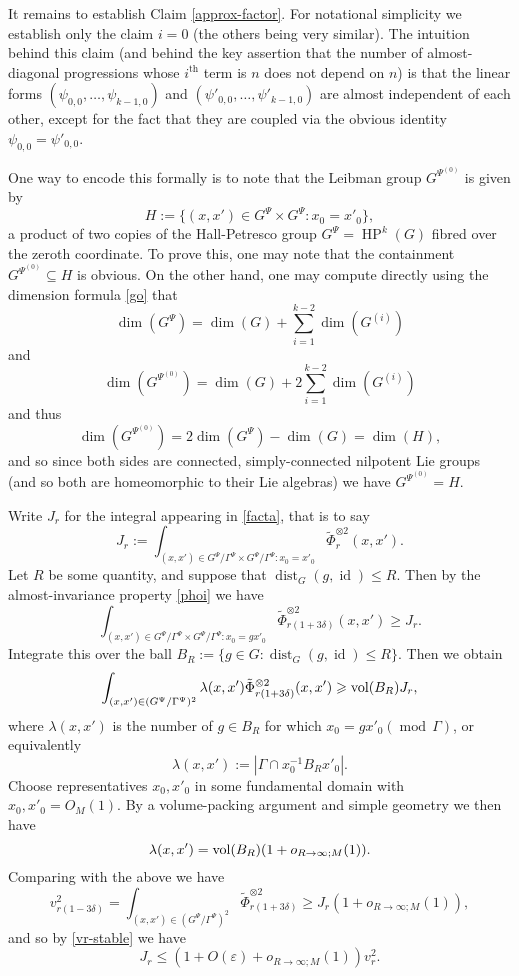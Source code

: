\documentclass[11pt,reqno]{amsart}
\numberwithin{equation}{section}
\theoremstyle{plain}
\theoremstyle{definition}
\renewcommand{\leq}{\leqslant}
\renewcommand{\geq}{\geqslant}
\newcommand{\md}[1]{\ensuremath{(\operatorname{mod}\, #1)}}
\newcommand\1{{\bf 1}}
\newcommand\2{{\bf 2}}
\newcommand\eps{\varepsilon}
\newcommand\HP{\operatorname{HP}}
\newcommand\id{\operatorname{id}}
\newcommand\dist{{\operatorname{dist}}}
\begin{document}
It remains to establish Claim \ref{approx-factor}. For notational simplicity we establish only the claim $i = 0$ (the others being very similar). The intuition behind this claim (and behind the key assertion that the number of almost-diagonal progressions whose $i^{\operatorname{th}}$ term is $n$ does not depend on $n$) is that the linear forms $(\psi_{0,0},\ldots,\psi_{k-1,0})$ and $(\psi'_{0,0},\ldots,\psi'_{k-1,0})$ are almost independent of each other, except for the fact that they are coupled via the obvious identity $\psi_{0,0} = \psi'_{0,0}$. 

One way to encode this formally is to note that the Leibman group $G^{\Psi^{(0)}}$ is given by
\[ H := \{ (x,x') \in G^{\Psi} \times G^{\Psi} : x_0 = x'_0\},\] a product of two copies of the Hall-Petresco group $G^{\Psi} = \HP^k(G)$ fibred over the zeroth coordinate. To prove this, one may note that the containment $G^{\Psi^{(0)}} \subseteq H$ is obvious. On the other hand, one may compute directly using the dimension formula \eqref{go} that
\[ \dim (G^{\Psi}) = \dim(G) + \sum_{i=1}^{k-2} \dim(G^{(i)}) \]
and
\[ \dim (G^{\Psi^{(0)}}) = \dim(G) + 2 \sum_{i=1}^{k-2} \dim(G^{(i)}) \]
and thus
\[ \dim(G^{\Psi^{(0)}}) = 2 \dim (G^{\Psi}) - \dim (G) = \dim (H),\] 
and so since both sides are connected, simply-connected nilpotent Lie groups (and so both are homeomorphic to their Lie algebras) we have $G^{\Psi^{(0)}} = H$.

Write $J_r$ for the integral appearing in \eqref{facta}, that is to say
\[ J_r := \int_{(x, x') \in G^{\Psi}/\Gamma^{\Psi} \times G^{\Psi}/\Gamma^{\Psi} : x_0 = x'_0} \tilde \Phi_r^{\otimes 2}(x,x').\]
Let $R$ be some quantity, and suppose that $\dist_G(g, \id) \leq R$. Then by the almost-invariance property \eqref{phoi} we have
\[ \int_{(x,x') \in G^{\Psi}/\Gamma^{\Psi} \times G^{\Psi}/\Gamma^{\Psi} : x_0 = gx'_0} \tilde \Phi_{r(1 + 3\delta)}^{\otimes 2}(x,x') \geq J_{r}.\]
Integrate this over the ball $B_R := \{g \in G: \dist_G(g,\id) \leq R\}$. Then we obtain
\[ \int_{(x,x') \in (G^{\Psi}/\Gamma^{\Psi} )^2} \lambda(x,x') \tilde \Phi_{r(1 + 3\delta)}^{\otimes 2}(x,x') \geq \vol(B_R) J_{r},\]
where $\lambda(x,x')$ is the number of $g \in B_R$ for which $x_0 = g x'_0 \md{\Gamma}$, or equivalently
\[ \lambda(x,x') := | \Gamma \cap x_0^{-1} B_R x'_0|.\] Choose representatives $x_0, x'_0$ in some fundamental domain with $x_0, x'_0 = O_M(1)$. 
By a volume-packing argument and simple geometry we then have
\[ \lambda(x,x') = \operatorname{vol}(B_R)(1 + o_{R \rightarrow \infty;M}(1)).\]
Comparing with the above we have
\[ v_{r(1 - 3\delta)}^2 = \int_{(x,x') \in (G^{\Psi}/\Gamma^{\Psi} )^2}  \tilde \Phi_{r(1 + 3\delta)}^{\otimes 2} \geq J_{r} (1 + o_{R \rightarrow \infty;M}(1)),\] and so by \eqref{vr-stable} we have
\[ J_r \leq (1 + O(\eps) + o_{R \rightarrow \infty;M}(1)) v_r^2.\]
\end{document}
